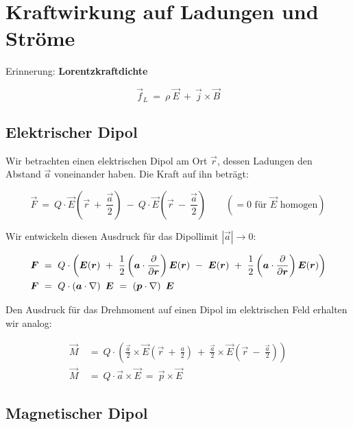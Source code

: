 \chapter{Kraftwirkung auf Ladungen und Ströme}

Erinnerung: \textbf{Lorentzkraftdichte}

\begin{equation*}
\vec{f}_L \ = \ \rho \ \vec{E} \ + \ \vec{j}\times\vec{B}
\end{equation*}

\section{Elektrischer Dipol}

Wir betrachten einen elektrischen Dipol am Ort $\vec{r}$, dessen Ladungen den Abstand $\vec{a}$ voneinander haben. Die Kraft auf ihn beträgt:

\begin{equation*}
\vec{F} \ = \ Q \cdot \vec{E}\left(\vec{r} \ + \ \frac{\vec{a}}{2}\right) \ - \ Q \cdot\vec{E} \left(\vec{r} \ - \ \frac{\vec{a}}{2}\right) \qquad (=0 \text{ für $\vec{E}$ homogen})
\end{equation*}

Wir entwickeln diesen Ausdruck für das Dipollimit $|\vec{a}| \rightarrow 0$:

\begin{align*}
\vec{F}  \ &= \ Q \cdot \left( \vec{E} (\vec{r}) \ + \ \frac{1}{2} \left(\vec{a}\cdot\pdiff{}{\vec{r}}\right) \vec{E}(\vec{r}) \ - \ \vec{E}(\vec{r}) \ + \ \frac{1}{2} \left(\vec{a}\cdot\pdiff{}{\vec{r}}\right)\vec{E}(\vec{r})\right) \\
\vec{F} \ &= \ Q\cdot \left(\vec{a}\cdot\nabla\right) \ \vec{E}  \ = \ \left( \vec{p} \cdot \nabla\right) \ \vec{E}
\end{align*}

Den Ausdruck für das Drehmoment auf einen Dipol im elektrischen Feld erhalten wir analog:

\begin{align*}
\vec{M}  \ &= \ Q \cdot \left(\frac{\vec{a}}{2} \times \vec{E}\left(\vec{r} \ + \ \frac{a}{2}\right) \ + \ \frac{\vec{a}}{2} \times \vec{E}\left(\vec{r} \ - \ \frac{\vec{a}}{2}\right)\right)\\
\vec{M}  \ &= \ Q \cdot \vec{a}\times\vec{E}  \ = \ \vec{p}\times\vec{E} 
\end{align*}

\section{Magnetischer Dipol}

